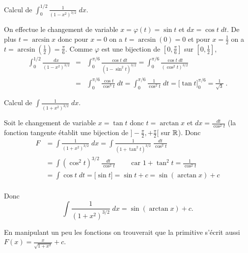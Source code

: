\documentclass[class=report,crop=false]{standalone}
\begin{document}
\begin{exemple}
Calcul de $\int_0^{1/2}\frac{1}{(1-x^2)^{3/2}} \;dx$.

On effectue le changement de variable $x=\varphi(t) = \sin t$ et $dx = \cos t \; dt$.
De plus $t=\arcsin x$ donc pour $x=0$ on a $t=\arcsin(0)=0$ et pour $x=\frac12$ on a $t=\arcsin(\frac12)=\frac\pi6$. Comme $\varphi$ est une bijection de $[0,\frac\pi6]$ sur $[0,\frac12]$,
\begin{eqnarray*}
\int_0^{1/2} \frac{dx}{(1-x^2)^{3/2}}
&=& \int_0^{\pi/6}\frac{\cos t \; dt}{(1-\sin^2 t)^{3/2}}
= \int_0^{\pi/6}\frac{\cos t \; dt}{(\cos^2 t)^{3/2}} \\
&=& \int_0^{\pi/6}\frac{\cos t}{\cos^3 t} \;dt
=  \int_0^{\pi/6}\frac{1}{\cos^2 t} \;dt
= \big[\tan t\big]_0^{\pi/6}
=\frac{1}{\sqrt{3}} \; .
\end{eqnarray*}
\end{exemple}


\begin{exemple}
Calcul de $\int \frac{1}{(1+x^2)^{3/2}} \; dx$.

Soit le changement de variable $x=\tan t$ donc $t = \arctan x$ et $dx = \frac{dt}{\cos^2 t}$
(la fonction tangente établit une bijection de $]-\frac\pi2,+\frac\pi2[$ sur $\mathbb{R}$).
Donc
\begin{align*}
F & = \int\frac{1}{(1+x^2)^{3/2}} \; dx  = \int \frac{1}{(1+\tan^2 t)^{3/2}}\; \frac{dt}{\cos^2 t} \\
  & = \int (\cos^2 t)^{3/2}\; \frac{dt}{\cos^2 t} \qquad \text{ car } 1+\tan^2t=\frac{1}{\cos^2t} \\
  & = \int \cos t\; dt
    = \big[ \sin t\big]
    = \sin t + c
    = \sin(\arctan x)+c \\
\end{align*}


Donc
$$\int \frac{1}{(1+x^2)^{3/2}}\;dx=\sin(\arctan x)+c.$$

En manipulant un peu les fonctions on trouverait que la primitive s'écrit aussi
$F(x)=\frac{x}{\sqrt{1+x^2}}+c$.
\end{exemple}


\end{document}
